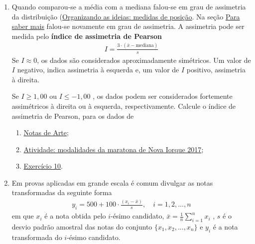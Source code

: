 {{{\begin{enumerate}
\begin{multicols}{2}
\end{multicols}

Usando todas as ferramentas estudadas neste capítulo, ajude este professor, fazendo um relatório detalhado e comparativo sobre os dois turnos. Se preferir, você poderá baixar estes dados no \textbf{link}, mas lembre-se que como eles estão registrados no GeoGebra, a vírgula foi trocada por ponto.

\clearpage
\item Quando comparou-se a média com a mediana falou-se em grau de assimetria da distribuição (\hyperref[\detokenize{PE104-1:sec-organizando1}]{Organizando as ideias: medidas de posição}. Na seção \hyperref[\detokenize{PE104-A:sec-para-saber-mais}]{Para saber mais} falou-se novamente em grau de assimetria. A assimetria pode ser medida pelo \textbf{índice de assimetria de Pearson}
\begin{equation*}
\begin{split}I=\frac{3\cdot(\bar{x}-\text{mediana})}{s}\end{split}
\end{equation*}
Se \(I\approx 0\), os dados são considerados aproximadamente simétricos. Um valor de \(I\) negativo, indica assimetria à esquerda e, um valor de \(I\) positivo, assimetria à direita.

Se \(I\geq 1,00\) ou \(I\leq -1,00\) , os dados podem ser considerados fortemente assimétricos à direita ou à esquerda, respectivamente. Calcule o índice de assimetria de Pearson, para os dados de
\begin{enumerate}
\item {} 
\hyperref[\detokenize{PE104-0:ativ-notas-de-artes}]{Notas de Arte};

\item {} 
\hyperref[\detokenize{PE104-7:ativ-comparacaodegruposusandoboxplot}]{Atividade: modalidades da maratona de Nova Iorque 2017};

\item {} 
\hyperref[exercicio-10]{Exercício 10}.

\end{enumerate}

\item Em provas aplicadas em grande escala é comum divulgar as notas transformadas da seguinte forma
\begin{equation*}
\begin{split}y_i = 500+100\cdot \frac{(x_i-\bar{x})}{s}, \quad i=1,2,...,n\end{split}
\end{equation*}
em que \(x_i\) é a nota obtida pelo \(i\)-ésimo candidato, \(\bar{x}=\frac{1}{n}\displaystyle{\sum^n_{i=1}}x_i\) , \(s\) é o desvio padrão amostral das notas do conjunto \(\{ x_1,x_2, ..., x_n\}\) e \(y_i\) é a nota transformada do \(i\)-ésimo candidato.


\end{enumerate}}}}
